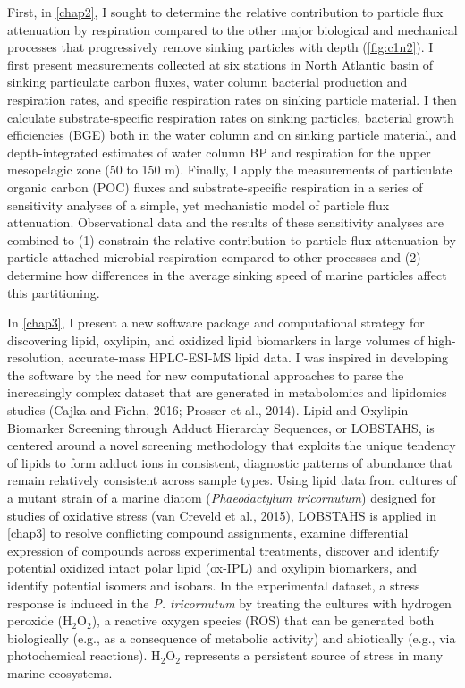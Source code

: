 First, in \autoref{chap2}, I sought to determine the relative contribution to particle flux attenuation by respiration compared to the other major biological and mechanical processes that progressively remove sinking particles with depth (\autoref{fig:c1n2}). I first present measurements collected at six stations in North Atlantic basin of sinking particulate carbon fluxes, water column bacterial production and respiration rates, and specific respiration rates on sinking particle material. I then calculate substrate-specific respiration rates on sinking particles, bacterial growth efficiencies (BGE) both in the water column and on sinking particle material, and depth-integrated estimates of water column BP and respiration for the upper mesopelagic zone (50 to 150 m). Finally, I apply the measurements of particulate organic carbon (POC) fluxes and substrate-specific respiration in a series of sensitivity analyses of a simple, yet mechanistic model of particle flux attenuation. Observational data and the results of these sensitivity analyses are combined to (1) constrain the relative contribution to particle flux attenuation by particle-attached microbial respiration compared to other processes and (2) determine how differences in the average sinking speed of marine particles affect this partitioning.

In \autoref{chap3}, I present a new software package and computational strategy for discovering lipid, oxylipin, and oxidized lipid biomarkers in large volumes of high-resolution, accurate-mass HPLC-ESI-MS lipid data. I was inspired in developing the software by the need for new computational approaches to parse the increasingly complex dataset that are generated in metabolomics and lipidomics studies (Cajka and Fiehn, 2016; Prosser et al., 2014). Lipid and Oxylipin Biomarker Screening through Adduct Hierarchy Sequences, or LOBSTAHS, is centered around a novel screening methodology that exploits the unique tendency of lipids to form adduct ions in consistent, diagnostic patterns of abundance that remain relatively consistent across sample types. Using lipid data from cultures of a mutant strain of a marine diatom (\emph{Phaeodactylum tricornutum}) designed for studies of oxidative stress (van Creveld et al., 2015), LOBSTAHS is applied in \autoref{chap3} to resolve conflicting compound assignments, examine differential expression of compounds across experimental treatments, discover and identify potential oxidized intact polar lipid (ox-IPL) and oxylipin biomarkers, and identify potential isomers and isobars. In the experimental dataset, a stress response is induced in the \emph{P. tricornutum} by treating the cultures with hydrogen peroxide (H$_2$O$_2$), a reactive oxygen species (ROS) that can be generated both biologically (e.g., as a consequence of metabolic activity) and abiotically (e.g., via photochemical reactions). H$_2$O$_2$ represents a persistent source of stress in many marine ecosystems.

